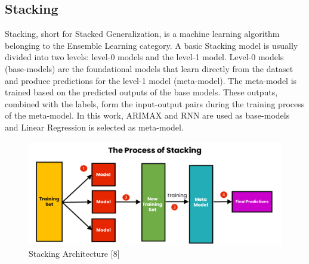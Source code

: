 \documentclass{ieeeojies}
\begin{document}
\subsection{Stacking}

Stacking, short for Stacked Generalization, is a machine learning algorithm belonging to the Ensemble Learning category. A basic Stacking model is usually divided into two levels: level-0 models and the level-1 model. Level-0 models (base-models) are the foundational models that learn directly from the dataset and produce predictions for the level-1 model (meta-model). The meta-model is trained based on the predicted outputs of the base models. These outputs, combined with the labels, form the input-output pairs during the training process of the meta-model. In this work, ARIMAX and RNN are used as base-models and Linear Regression is selected as meta-model.  
\begin{figure}[H]
  \centering
  \begin{minipage}{0.8\linewidth}
    \centering
    \includegraphics[width=\linewidth]{Stacking.png}
    \caption{Stacking Architecture [8]}
    \label{fig8}
  \end{minipage}
\end{figure}
\end{document}

